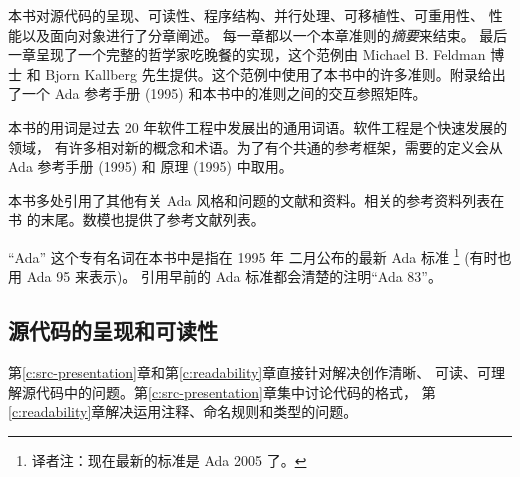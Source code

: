 本书对源代码的呈现、可读性、程序结构、并行处理、可移植性、可重用性、
性能以及面向对象进行了分章阐述。 每一章都以一个本章准则的\emph{摘要}来结束。
最后一章呈现了一个完整的哲学家吃晚餐的实现，这个范例由 Michael B. Feldman 博士
和 Bjorn Kallberg 先生提供。这个范例中使用了本书中的许多准则。附录给出了一个
Ada 参考手册 (1995) 和本书中的准则之间的交互参照矩阵。

本书的用词是过去 20 年软件工程中发展出的通用词语。软件工程是个快速发展的领域，
有许多相对新的概念和术语。为了有个共通的参考框架，需要的定义会从 Ada 参考手册
(1995) 和 原理 (1995) 中取用。

本书多处引用了其他有关 Ada 风格和问题的文献和资料。相关的参考资料列表在书
的末尾。数模也提供了参考文献列表。

``Ada'' 这个专有名词在本书中是指在 1995 年 二月公布的最新 Ada 标准
\footnote{译者注：现在最新的标准是 Ada 2005 了。} (有时也用 Ada 95 来表示)。
引用早前的 Ada 标准都会清楚的注明``Ada 83''。

\subsection{源代码的呈现和可读性}
第\ref{c:src-presentation}章和第\ref{c:readability}章直接针对解决创作清晰、
可读、可理解源代码中的问题。第\ref{c:src-presentation}章集中讨论代码的格式，
第\ref{c:readability}章解决运用注释、命名规则和类型的问题。
